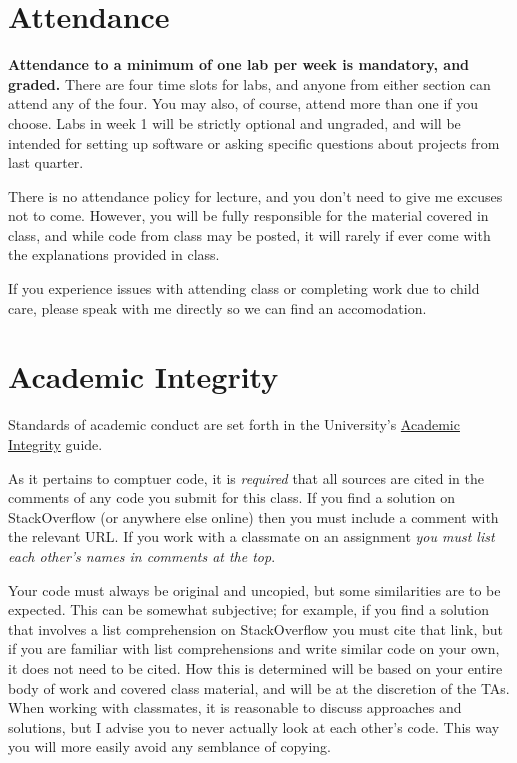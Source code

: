 \documentclass{article}
\begin{document}
\section*{Attendance}
\textbf{Attendance to a minimum of one lab per week is mandatory, and graded.}  There are four time slots for labs, and anyone from either section can attend any of the four.  You may also, of course, attend more than one if you choose.  Labs in week 1 will be strictly optional and ungraded, and will be intended for setting up software or asking specific questions about projects from last quarter.

There is no attendance policy for lecture, and you don't need to give me excuses not to come.  However, you will be fully responsible for the material covered in class, and while code from class may be posted, it will rarely if ever come with the explanations provided in class.

If you experience issues with attending class or completing work due to child care, please speak with me directly so we can find an accomodation.

\section*{Academic Integrity}
Standards of academic conduct are set forth in the University's \href{https://college.uchicago.edu/advising/academic-integrity-student-conduct}{Academic Integrity} guide.  

As it pertains to comptuer code, it is \emph{required} that all sources are cited in the comments of any code you submit for this class.  If you find a solution on StackOverflow (or anywhere else online) then you must include a comment with the relevant URL.  If you work with a classmate on an assignment \emph{you must list each other's names in comments at the top}.  

Your code must always be original and uncopied, but some similarities are to be expected.  This can be somewhat subjective; for example, if you find a solution that involves a list comprehension on StackOverflow you must cite that link, but if you are familiar with list comprehensions and write similar code on your own, it does not need to be cited.  How this is determined will be based on your entire body of work and covered class material, and will be at the discretion of the TAs.  When working with classmates, it is reasonable to discuss approaches and solutions, but I advise you to never actually look at each other's code.  This way you will more easily avoid any semblance of copying.
\end{document}
